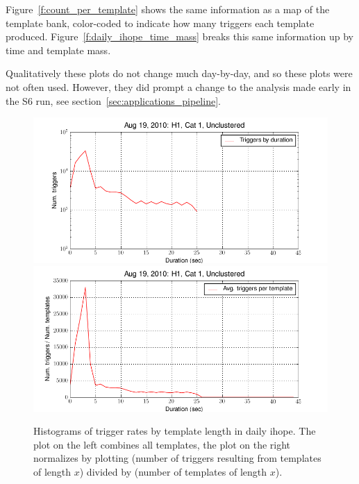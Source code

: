 Figure~\ref{f:count_per_template} shows the same information as a map
of the template bank, color-coded to indicate how many triggers each
template produced.  Figure~\ref{f:daily_ihope_time_mass} breaks this
same information up by time and template mass.

Qualitatively these plots do not change much day-by-day, and so these
plots were not often used.  However, they did prompt a change to
the analysis made early in the S6 run, see
section~\ref{sec:applications_pipeline}.

\begin{figure}
  \includegraphics[width=0.5\linewidth]{figures/detchar/H1_1_UNCLUSTERED_mass_hist}
  \includegraphics[width=0.5\linewidth]{figures/detchar/H1_1_UNCLUSTERED_mass_hist_norm}
  \caption[Histograms of trigger rates by template length]{
  \label{f:daily_ihope_trig_histograms}
Histograms of trigger rates by template length in daily ihope.  The
plot on the left combines all templates, the plot on the right
normalizes by plotting (number of triggers resulting from templates of
length $x$) divided by (number of templates of length $x$).
}
\end{figure}%

